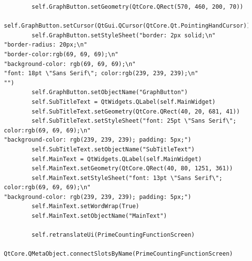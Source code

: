 \documentclass{article}
\begin{document}
\begin{lstlisting}
        self.GraphButton.setGeometry(QtCore.QRect(570, 460, 200, 70))
        self.GraphButton.setCursor(QtGui.QCursor(QtCore.Qt.PointingHandCursor))
        self.GraphButton.setStyleSheet("border: 2px solid;\n"
"border-radius: 20px;\n"
"border-color:rgb(69, 69, 69);\n"
"background-color: rgb(69, 69, 69);\n"
"font: 18pt \"Sans Serif\"; color:rgb(239, 239, 239);\n"
"")
        self.GraphButton.setObjectName("GraphButton")
        self.SubTitleText = QtWidgets.QLabel(self.MainWidget)
        self.SubTitleText.setGeometry(QtCore.QRect(40, 20, 681, 41))
        self.SubTitleText.setStyleSheet("font: 25pt \"Sans Serif\"; color:rgb(69, 69, 69);\n"
"background-color: rgb(239, 239, 239); padding: 5px;")
        self.SubTitleText.setObjectName("SubTitleText")
        self.MainText = QtWidgets.QLabel(self.MainWidget)
        self.MainText.setGeometry(QtCore.QRect(40, 80, 1251, 361))
        self.MainText.setStyleSheet("font: 13pt \"Sans Serif\"; color:rgb(69, 69, 69);\n"
"background-color: rgb(239, 239, 239); padding: 5px;")
        self.MainText.setWordWrap(True)
        self.MainText.setObjectName("MainText")

        self.retranslateUi(PrimeCountingFunctionScreen)
        QtCore.QMetaObject.connectSlotsByName(PrimeCountingFunctionScreen)


\end{lstlisting}
\end{document}
